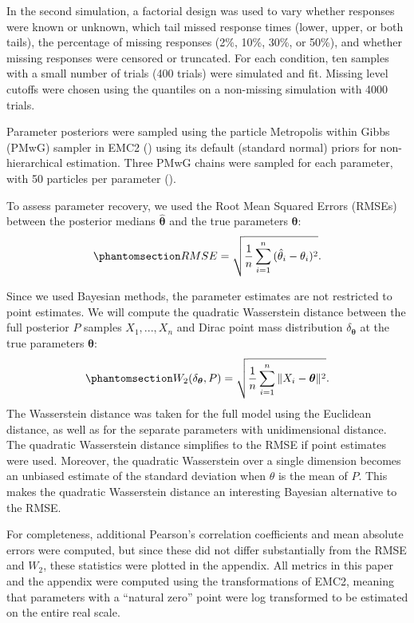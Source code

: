 \documentclass[
  stu,
  floatsintext,
  longtable,
  nolmodern,
  notxfonts,
  notimes,
  draftfirst,
  colorlinks=true,linkcolor=blue,citecolor=blue,urlcolor=blue]{apa7}
\begin{document}
In the second simulation, a factorial design was used to vary whether
responses were known or unknown, which tail missed response times
(lower, upper, or both tails), the percentage of missing responses (2\%,
10\%, 30\%, or 50\%), and whether missing responses were censored or
truncated. For each condition, ten samples with a small number of trials
(400 trials) were simulated and fit. Missing level cutoffs were chosen
using the quantiles on a non-missing simulation with 4000 trials.

Parameter posteriors were sampled using the particle Metropolis within
Gibbs (PMwG) sampler in EMC2 () using its default (standard normal) priors for non-hierarchical
estimation. Three PMwG chains were sampled for each parameter, with 50
particles per parameter ().

To assess parameter recovery, we used the Root Mean Squared Errors
(RMSEs) between the posterior medians \(\boldsymbol{\hat{\theta}}\) and
the true parameters \(\boldsymbol{\theta}\):
\begin{equation}\phantomsection\label{eq-RMSE}{
RMSE = \sqrt{\frac{1}{n}\sum_{i=1}^{n}{(\hat{\theta}_i - \theta_i)^2}}.
}\end{equation}

Since we used Bayesian methods, the parameter estimates are not
restricted to point estimates. We will compute the quadratic Wasserstein
distance between the full posterior \(P\) samples \(X_1,...,X_n\) and
Dirac point mass distribution \(\delta_{\boldsymbol{\theta}}\) at the
true parameters \(\boldsymbol{\theta}\):
\begin{equation}\phantomsection\label{eq-Wasserstein}{
W_2(\delta_{\boldsymbol{\theta}}, P) = \sqrt{\frac{1}{n} \sum_{i=1}^{n}{\|X_i - \boldsymbol{\theta}\|^2}}.
}\end{equation} The Wasserstein distance was taken for the full model
using the Euclidean distance, as well as for the separate parameters
with unidimensional distance. The quadratic Wasserstein distance
simplifies to the RMSE if point estimates were used. Moreover, the
quadratic Wasserstein over a single dimension becomes an unbiased
estimate of the standard deviation when \(\theta\) is the mean of \(P\).
This makes the quadratic Wasserstein distance an interesting Bayesian
alternative to the RMSE.

For completeness, additional Pearson's correlation coefficients and mean
absolute errors were computed, but since these did not differ
substantially from the RMSE and \(W_2\), these statistics were plotted
in the appendix. All metrics in this paper and the appendix were
computed using the transformations of EMC2, meaning that parameters with
a ``natural zero'' point were log transformed to be estimated on the
entire real scale.
\end{document}

